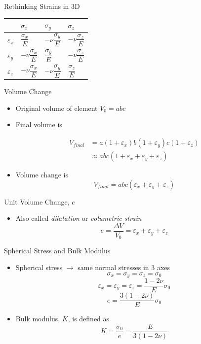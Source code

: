\documentclass[10pt, svgnames]{beamer}
\begin{document}
\begin{frame}[label={sec:orgff20b5b}]{Rethinking Strains in 3D}
\begin{center}
\begin{tabular}{llll}
\toprule
 & \(\sigma_x\) & \(\sigma_y\) & \(\sigma_z\)\\[0pt]
\midrule
\(\varepsilon_x\) & \(\dfrac{\sigma_x}{E}\) & \(-\nu \dfrac{\sigma_y}{E}\) & \(-\nu \dfrac{\sigma_z}{E}\)\\[0pt]
\(\varepsilon_y\) & \(-\nu \dfrac{\sigma_x}{E}\) & \(\dfrac{\sigma_y}{E}\) & \(-\nu \dfrac{\sigma_z}{E}\)\\[0pt]
\(\varepsilon_z\) & \(-\nu \dfrac{\sigma_x}{E}\) & \(-\nu\dfrac{\sigma_y}{E}\) & \(\dfrac{\sigma_z}{E}\)\\[0pt]
\bottomrule
\end{tabular}
\end{center}
\end{frame}

\begin{frame}[label={sec:orgcd32728}]{Volume Change}
\begin{itemize}
\item Original volume of element \(V_0 = abc\)

\item Final volume is

\begin{align*}
  V_{final} &= a \left( 1 + \varepsilon_x \right) b \left( 1 + \varepsilon_y \right) c \left( 1 + \varepsilon_z \right) \\
            &\approx abc \left( 1 + \varepsilon_x + \varepsilon_y + \varepsilon_z \right)
\end{align*}

\item Volume change is
\[V_{final} = abc \left( \varepsilon_x + \varepsilon_y + \varepsilon_z \right)\]
\end{itemize}
\end{frame}

\begin{frame}[label={sec:orgb904a0e}]{Unit Volume Change, \(e\)}
\begin{itemize}
\item Also called \emph{dilatation} or \emph{volumetric strain}
\[e = \frac{\Delta V}{V_0} = \varepsilon_x + \varepsilon_y + \varepsilon_z\]
\end{itemize}
\end{frame}

\begin{frame}[label={sec:org6d5f167}]{Spherical Stress and Bulk Modulus}
\begin{itemize}
\item Spherical stress \(\rightarrow\) same normal stresses in 3 axes
\[\sigma_x = \sigma_y = \sigma_z = \sigma_0\]
\[\varepsilon_x = \varepsilon_y = \varepsilon_z = \frac{1-2\nu}{E} \sigma_0\]
\[e = \frac{3(1-2\nu)}{E} \sigma_0\]

\item Bulk modulus, \(K\), is defined as
\[K = \frac{\sigma_0}{e} = \frac{E}{3(1-2\nu)}\]
\end{itemize}
\end{frame}
\end{document}
